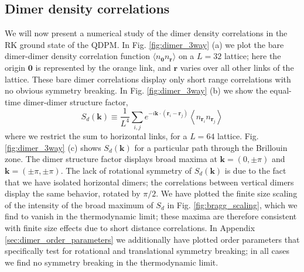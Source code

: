 \documentclass[twocolumn,prb,aps,floatfix,superscriptaddress]{revtex4-1}
\newcommand{\figref}[1]{Fig. \ref{#1}}
\newcommand{\appref}[1]{Appendix \ref{#1}}
\begin{document}
\subsection{Dimer density correlations}

We will now present a numerical study of the dimer density correlations in the RK ground state of the QDPM. In \figref{fig:dimer_3way} (a) we plot the bare dimer-dimer density correlation function $\langle n_{\bm{0}} n_{\bm{r}}\rangle$ on a $L=32$ lattice; here the origin $\bm{0}$ is represented by the orange link, and $\bm{r}$ varies over all other links of the lattice. These bare dimer correlations display only short range correlations with no obvious symmetry breaking. In \figref{fig:dimer_3way} (b) we show the equal-time dimer-dimer structure factor, 
\begin{equation}
S_d\left( \bm{k} \right) \equiv \frac{1}{ L^4} \sum_{i,j} e^{-i \bm{k} \cdot \left(\bm{r}_i - \bm{r}_j\right)} \left \langle n_{\bm{r}_i} n_{\bm{r}_j} \right \rangle
\end{equation}
where we restrict the sum to horizontal links, for a $L=64$ lattice. 
\figref{fig:dimer_3way} (c) shows $S_d(\bm{k})$ for a particular path through the Brillouin zone. The dimer structure factor displays broad maxima at $\bm{k} = (0, \pm \pi)$ and $\bm{k} = (\pm \pi, \pm \pi)$. The lack of rotational symmetry of $S_d(\bm{k})$ is due to the fact that we have isolated horizontal dimers; the correlations between vertical dimers display the same behavior, rotated by $\pi/2$.
We have plotted the finite size scaling of the intensity of the broad maximum of $S_d$ in  \figref{fig:bragg_scaling}, which we find to vanish in the thermodynamic limit; these maxima are therefore consistent with finite size effects due to short distance correlations. In \appref{sec:dimer_order_parameters} we additionally have plotted order parameters that specifically test for rotational and translational symmetry breaking; in all cases we find no symmetry breaking in the thermodynamic limit. 
\end{document}
